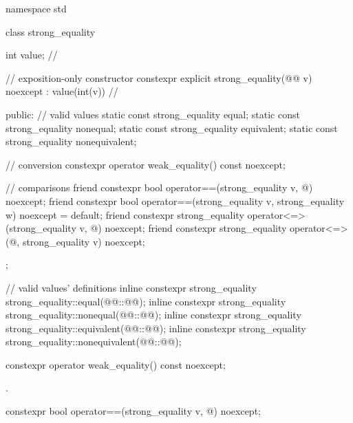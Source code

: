 %
%
%
%
%
\begin{codeblock}
namespace std {
  class strong_equality {
    int value;  // \expos

    // exposition-only constructor
    constexpr explicit strong_equality(@@ v) noexcept : value(int(v)) {}    // \expos

  public:
    // valid values
    static const strong_equality equal;
    static const strong_equality nonequal;
    static const strong_equality equivalent;
    static const strong_equality nonequivalent;

    // conversion
    constexpr operator weak_equality() const noexcept;

    // comparisons
    friend constexpr bool operator==(strong_equality v, @\unspec@) noexcept;
    friend constexpr bool operator==(strong_equality v, strong_equality w) noexcept = default;
    friend constexpr strong_equality operator<=>(strong_equality v, @\unspec@) noexcept;
    friend constexpr strong_equality operator<=>(@\unspec@, strong_equality v) noexcept;
  };

  // valid values' definitions
  inline constexpr strong_equality strong_equality::equal(@@::@@);
  inline constexpr strong_equality strong_equality::nonequal(@@::@@);
  inline constexpr strong_equality strong_equality::equivalent(@@::@@);
  inline constexpr strong_equality strong_equality::nonequivalent(@@::@@);
}
\end{codeblock}

%
\begin{itemdecl}
constexpr operator weak_equality() const noexcept;
\end{itemdecl}

\begin{itemdescr}
\pnum
\returns
{}.
\end{itemdescr}

%
\begin{itemdecl}
constexpr bool operator==(strong_equality v, @\unspec@) noexcept;
\end{itemdecl}

